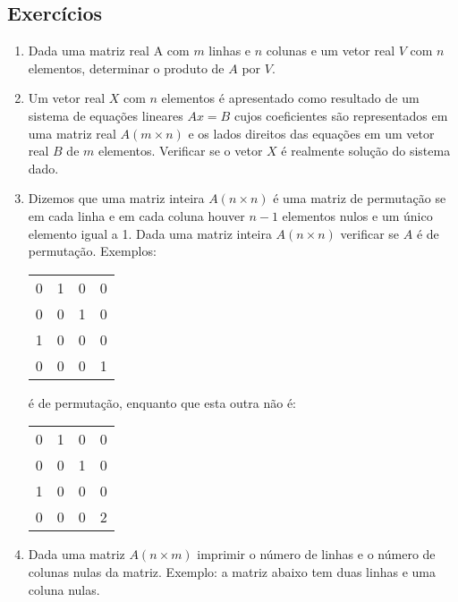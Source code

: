 \subsection{Exercícios}


\begin{enumerate}

\item Dada uma matriz real A com $m$ linhas e $n$ colunas e um vetor real $V$ 
com $n$ elementos, determinar o produto  de $A$ por $V$. 

\item Um  vetor real $X$ com $n$  elementos é apresentado como  resultado 
de um sistema de  equações lineares $Ax=B$ cujos  coeficientes são representados
em uma  matriz real $A  (m \times n)$  e os lados  direitos das equações  em um
vetor real $B$ de $m$ elementos.  Verificar se o vetor $X$ é realmente solução
do sistema dado. 

\item Dizemos que uma  matriz inteira $A (n \times n)$ é 
uma matriz de permutação
se em cada linha e em cada  coluna houver $n-1$ elementos nulos e um único
elemento igual a 1.  Dada uma matriz inteira $A (n \times  n)$ verificar se 
$A$ é de permutação. Exemplos:

\begin{center}
\begin{tabular}{cccc}
0 & 1 & 0 & 0 \\ 
0 & 0 & 1 & 0 \\
1 & 0 & 0 & 0 \\
0 & 0 & 0 & 1 \\
\end{tabular}
\end{center}

é de permutação, enquanto que esta outra não é:

\begin{center}
\begin{tabular}{cccc}
0 & 1 & 0 & 0 \\
0 & 0 & 1 & 0 \\
1 & 0 & 0 & 0 \\
0 & 0 & 0 & 2 \\
\end{tabular}
\end{center}

\item Dada uma matriz  $A (n \times m)$ 
imprimir o número de  linhas e o número de
colunas nulas da matriz. Exemplo: a matriz abaixo 
tem duas linhas e uma coluna nulas. 


\end{enumerate}
